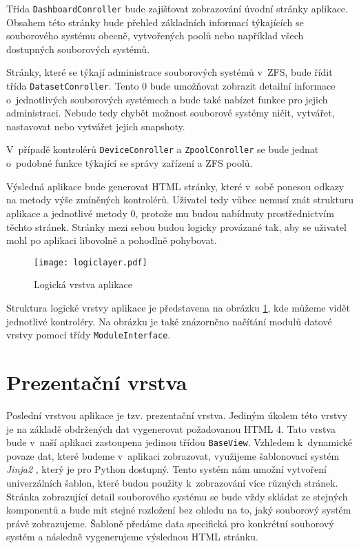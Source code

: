     Třída \verb|DashboardConroller| bude zajišťovat zobrazování úvodní stránky aplikace. Obsahem této stránky bude přehled základních informací týkajících se souborového systému obecně, vytvořených poolů nebo například všech dostupných souborových systémů.

    Stránky, které se týkají administrace souborových systémů v~ZFS, bude řídit třída \verb|DatasetConroller|. Tento 0 bude umožňovat zobrazit detailní informace o~jednotlivých souborových systémech a bude také nabízet funkce pro jejich administraci. Nebude tedy chybět možnost souborové systémy ničit, vytvářet, nastavovat nebo vytvářet jejich snapshoty.

    V~případě kontrolérů \verb|DeviceConroller| a \verb|ZpoolConroller| se bude jednat o~podobné funkce týkající se správy zařízení a ZFS poolů.

    Výsledná aplikace bude generovat HTML stránky, které v~sobě ponesou odkazy na metody výše zmíněných kontrolérů. Uživatel tedy vůbec nemusí znát strukturu aplikace a jednotlivé metody 0, protože mu budou nabídnuty prostřednictvím těchto stránek. Stránky mezi sebou budou logicky provázané tak, aby se uživatel mohl po aplikaci libovolně a pohodlně pohybovat.
    
    \begin{figure}
        \centering
        \texttt{[image: logiclayer.pdf]}
        \caption{Logická vrstva aplikace}
        \label{logiclayer}
    \end{figure}
    
    Struktura logické vrstvy aplikace je představena na obrázku \ref{logiclayer}, kde můžeme vidět jednotlivé kontroléry. Na obrázku je také znázorněno načítání modulů datové vrstvy pomocí třídy \verb|ModuleInterface|.

\section{Prezentační vrstva}
Poslední vrstvou aplikace je tzv. prezentační vrstva. Jediným úkolem této vrstvy je na základě obdržených dat vygenerovat požadovanou HTML 4. Tato vrstva bude v~naší aplikaci zastoupena jedinou třídou \verb|BaseView|. Vzhledem k~dynamické povaze dat, které budeme v~aplikaci zobrazovat, využijeme šablonovací systém \emph{Jinja2} \cite{jinja2}, který je pro Python dostupný. Tento systém nám umožní vytvoření univerzálních šablon, které budou použity k~zobrazování více různých stránek. Stránka zobrazující detail souborového systému se bude vždy skládat ze stejných komponentů a bude mít stejné rozložení bez ohledu na to, jaký souborový systém právě zobrazujeme. Šabloně předáme data specifická pro konkrétní souborový systém a následně vygenerujeme výslednou HTML stránku.
